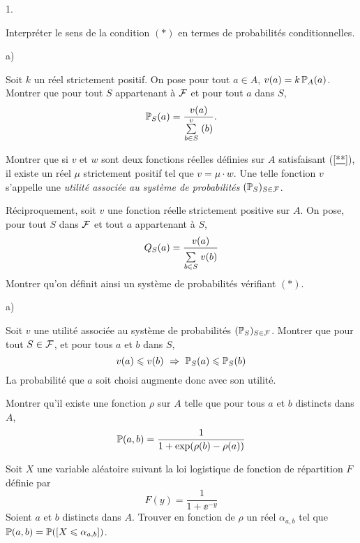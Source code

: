 \documentclass[11pt]{article}%
\begin{document}
\begin{noliste}{1.}
 \item Interpréter le sens de la condition $(*)$ en termes de 
  probabilités conditionnelles.
  
  \item 
  \begin{noliste}{a)}
    \item Soit $k$ un réel strictement positif. On pose pour tout 
    $a\in A$,  $v(a)=k \, \mathbb{P}_A(a)$. Montrer que pour tout $S$ 
    appartenant à ${\cal F}$ et pour tout $a$ dans $S$, 
    \begin{equation}\label{**}
     \mathbb{P}_S(a)= \dfrac{v(a)}{{\textstyle\sum\limits_{b\in S}^{v}}\hspace{.1cm}(b)}. 
    \end{equation}
    
    \item Montrer que si $v$ et $w$ sont deux fonctions réelles 
    définies sur $A$ satisfaisant (\ref{**}), il existe un réel $\mu$ 
    strictement positif tel que $v=\mu \cdot w$. 
    Une telle fonction $v$ s'appelle une {\it utilité associée au 
    système de probabilités} $(\mathbb{P}_S)_{S\in {\cal F}}$.
  \end{noliste}
  
  \item Réciproquement, soit $v$ une fonction réelle 
  strictement positive sur $A$. On pose,  pour tout $S$ dans ${\cal F}$ 
  et tout $a$ appartenant à $S$, 
  \[
   Q_S(a)= \dfrac{v(a)}{{\textstyle\sum\limits_{b\in S}^{}}\hspace{.1cm} v(b)}
  \]
  Montrer qu'on définit ainsi un système de probabilités vérifiant 
  $(*)$.
  
  \item 
  \begin{noliste}{a)}
    \item Soit $v$ une utilité associée au système 
    de probabilités $(\mathbb{P}_S)_{S\in {\cal F}}$. Montrer que pour tout 
    $S\in {\cal F}$, et pour tous $a$ et $b$ dans $S$, 
    \[
     v(a)\leqslant v(b) \ \Rightarrow \ \mathbb{P}_S(a) \leqslant \mathbb{P}_S(b)
    \]
    La probabilité que $a$ soit choisi augmente donc avec son utilité.
    
    \item Montrer qu'il existe une fonction $\rho $ sur $A$ telle 
    que pour tous $a$ et $b$ distincts dans $A$,
    \[
     \mathbb{P}(a,b) = \dfrac{1}{1+\exp(\rho (b)-\rho (a))}
    \]
    
    \item Soit $X$ une variable aléatoire suivant la loi 
    logistique de fonction de répartition $F$ définie par 
    \[
      F(y)=\dfrac{1}{ 1+\ee^{-y}}
    \]
    Soient $a$ et $b$ distincts dans $A$. Trouver  en fonction de $\rho$ 
    un réel $\alpha_{a,b}$ tel que $\mathbb{P}(a,b)=\mathbb{P}(\left[ {X\leqslant 
    \alpha_{a,b}} \right])$.
  \end{noliste}
  

\end{noliste}
\end{document}
